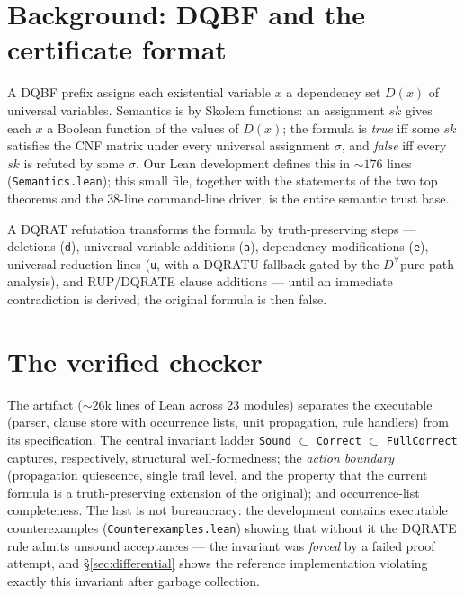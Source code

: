 \documentclass{article}
\begin{document}
\section{Background: DQBF and the certificate format}\label{sec:bg}
A DQBF prefix assigns each existential variable $x$ a dependency set
$D(x)$ of universal variables. Semantics is by Skolem functions: an
assignment $\mathit{sk}$ gives each $x$ a Boolean function of the values of
$D(x)$; the formula is \emph{true} iff some $\mathit{sk}$ satisfies the CNF
matrix under every universal assignment $\sigma$, and \emph{false} iff every
$\mathit{sk}$ is refuted by some $\sigma$. Our Lean development defines this
in ${\sim}176$ lines (\texttt{Semantics.lean}); this small file, together
with the statements of the two top theorems and the 38-line command-line
driver, is the entire semantic trust base.

A DQRAT refutation transforms the formula by truth-preserving steps ---
deletions (\texttt{d}), universal-variable additions (\texttt{a}),
dependency modifications (\texttt{e}), universal reduction lines
(\texttt{u}, with a DQRATU fallback gated by the $D^{\forall}$pure path
analysis), and RUP/DQRATE clause additions --- until an immediate
contradiction is derived; the original formula is then false.

\section{The verified checker}\label{sec:checker}
The artifact (${\sim}26$k lines of Lean across 23 modules) separates the
executable (parser, clause store with occurrence lists, unit propagation,
rule handlers) from its specification. The central invariant ladder
\texttt{Sound} $\subset$ \texttt{Correct} $\subset$ \texttt{FullCorrect}
captures, respectively, structural well-formedness; the \emph{action
boundary} (propagation quiescence, single trail level, and the property that
the current formula is a truth-preserving extension of the original); and
occurrence-list completeness. The last is not bureaucracy: the development
contains executable counterexamples (\texttt{Counterexamples.lean}) showing
that without it the DQRATE rule admits unsound acceptances --- the invariant
was \emph{forced} by a failed proof attempt, and \S\ref{sec:differential}
shows the reference implementation violating exactly this invariant after
garbage collection.
\end{document}
